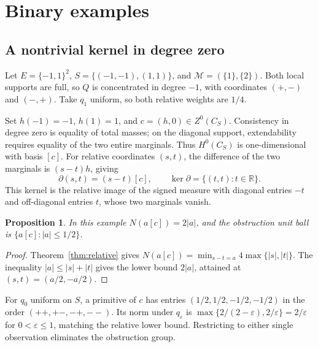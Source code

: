 \documentclass[11pt,a4paper]{article}
\numberwithin{equation}{section}
\newtheorem{proposition}[theorem]{Proposition}
\theoremstyle{remark}
\newcommand{\R}{\mathbb R}
\newcommand{\M}{\mathcal M}
\begin{document}
\section{Binary examples}\label{sec:examples}
\subsection{A nontrivial kernel in degree zero}
Let $E=\{-1,1\}^2$, $S=\{(-1,-1),(1,1)\}$, and $\M=(\{1\},\{2\})$. Both local supports are full, so $Q$ is concentrated in degree $-1$, with coordinates $(+,-)$ and $(-,+)$. Take $q_1$ uniform, so both relative weights are $1/4$.

Set $h(-1)=-1$, $h(1)=1$, and $c=(h,0)\in Z^0(C_S)$. Consistency in degree zero is equality of total masses; on the diagonal support, extendability requires equality of the two entire marginals. Thus $H^0(C_S)$ is one-dimensional with basis $[c]$. For relative coordinates $(s,t)$, the difference of the two marginals is $(s-t)h$, giving
\[
 \partial(s,t)=(s-t)[c],\qquad\ker\partial=\{(t,t):t\in\R\}.
\]
This kernel is the relative image of the signed measure with diagonal entries $-t$ and off-diagonal entries $t$, whose two marginals vanish.

\begin{proposition}
In this example $N(a[c])=2|a|$, and the obstruction unit ball is $\{a[c]:|a|\le1/2\}$.
\end{proposition}
\begin{proof}
Theorem~\ref{thm:relative} gives $N(a[c])=\min_{s-t=a}4\max\{|s|,|t|\}$. The inequality $|a|\le|s|+|t|$ gives the lower bound $2|a|$, attained at $(s,t)=(a/2,-a/2)$.
\end{proof}
For $q_0$ uniform on $S$, a primitive of $c$ has entries $(1/2,1/2,-1/2,-1/2)$ in the order $(++,+-,-+,--)$. Its norm under $q_\varepsilon$ is $\max\{2/(2-\varepsilon),2/\varepsilon\}=2/\varepsilon$ for $0<\varepsilon\le1$, matching the relative lower bound. Restricting to either single observation eliminates the obstruction group.
\end{document}
